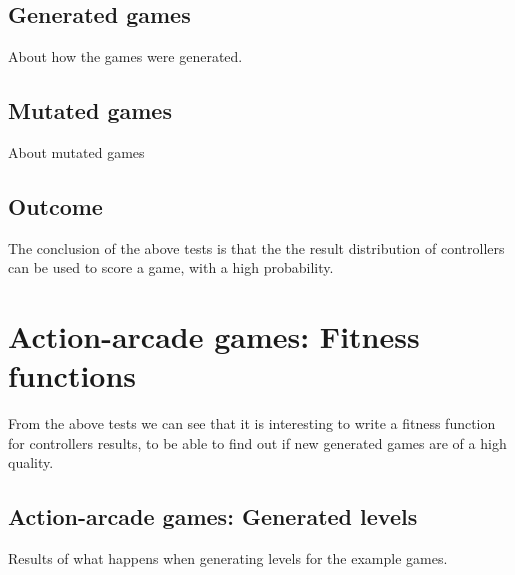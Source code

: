 \documentclass[a4paper,titlepage,final, twoside]{report}
\begin{document}
\subsection{Generated games}
About how the games were generated.

\subsection{Mutated games}
About mutated games

\subsection{Outcome}
The conclusion of the above tests is that the the result distribution of controllers can be used to score a game, with a high probability.


\section{Action-arcade games: Fitness functions}
From the above tests we can see that it is interesting to write a fitness function for controllers results, to be able to find out if new generated games are of a high quality.


\subsection{Action-arcade games: Generated levels}
Results of what happens when generating levels for the example games.





%
%
%
%
%





\newpage
\appendix
\end{document}
